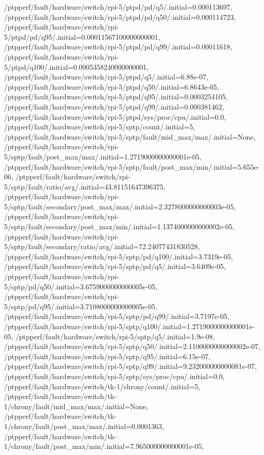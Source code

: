 {    /ptpperf/fault/hardware/switch/rpi-5/ptpd/pd/q5/.initial=0.000113697,
    /ptpperf/fault/hardware/switch/rpi-5/ptpd/pd/q50/.initial=0.000114723,
    /ptpperf/fault/hardware/switch/rpi-5/ptpd/pd/q95/.initial=0.00011567100000000001,
    /ptpperf/fault/hardware/switch/rpi-5/ptpd/pd/q99/.initial=0.00011618,
    /ptpperf/fault/hardware/switch/rpi-5/ptpd/q100/.initial=0.0005358240000000001,
    /ptpperf/fault/hardware/switch/rpi-5/ptpd/q5/.initial=6.88e-07,
    /ptpperf/fault/hardware/switch/rpi-5/ptpd/q50/.initial=6.8643e-05,
    /ptpperf/fault/hardware/switch/rpi-5/ptpd/q95/.initial=0.0003254105,
    /ptpperf/fault/hardware/switch/rpi-5/ptpd/q99/.initial=0.000381462,
    /ptpperf/fault/hardware/switch/rpi-5/ptpd/sys/proc/cpu/.initial=0.0,
    /ptpperf/fault/hardware/switch/rpi-5/sptp/count/.initial=5,
    /ptpperf/fault/hardware/switch/rpi-5/sptp/fault/mid_max/max/.initial=None,
    /ptpperf/fault/hardware/switch/rpi-5/sptp/fault/post_max/max/.initial=1.2719000000000001e-05,
    /ptpperf/fault/hardware/switch/rpi-5/sptp/fault/post_max/min/.initial=5.655e-06,
    /ptpperf/fault/hardware/switch/rpi-5/sptp/fault/ratio/avg/.initial=43.81151647396375,
    /ptpperf/fault/hardware/switch/rpi-5/sptp/fault/secondary/post_max/max/.initial=2.3278000000000003e-05,
    /ptpperf/fault/hardware/switch/rpi-5/sptp/fault/secondary/post_max/min/.initial=1.1374000000000002e-05,
    /ptpperf/fault/hardware/switch/rpi-5/sptp/fault/secondary/ratio/avg/.initial=72.24077431830528,
    /ptpperf/fault/hardware/switch/rpi-5/sptp/pd/q100/.initial=3.7319e-05,
    /ptpperf/fault/hardware/switch/rpi-5/sptp/pd/q5/.initial=3.6409e-05,
    /ptpperf/fault/hardware/switch/rpi-5/sptp/pd/q50/.initial=3.6759000000000005e-05,
    /ptpperf/fault/hardware/switch/rpi-5/sptp/pd/q95/.initial=3.7108000000000005e-05,
    /ptpperf/fault/hardware/switch/rpi-5/sptp/pd/q99/.initial=3.7197e-05,
    /ptpperf/fault/hardware/switch/rpi-5/sptp/q100/.initial=1.2719000000000001e-05,
    /ptpperf/fault/hardware/switch/rpi-5/sptp/q5/.initial=1.9e-08,
    /ptpperf/fault/hardware/switch/rpi-5/sptp/q50/.initial=2.1100000000000002e-07,
    /ptpperf/fault/hardware/switch/rpi-5/sptp/q95/.initial=6.15e-07,
    /ptpperf/fault/hardware/switch/rpi-5/sptp/q99/.initial=9.232000000000081e-07,
    /ptpperf/fault/hardware/switch/rpi-5/sptp/sys/proc/cpu/.initial=0.0,
    /ptpperf/fault/hardware/switch/tk-1/chrony/count/.initial=5,
    /ptpperf/fault/hardware/switch/tk-1/chrony/fault/mid_max/max/.initial=None,
    /ptpperf/fault/hardware/switch/tk-1/chrony/fault/post_max/max/.initial=0.0001363,
    /ptpperf/fault/hardware/switch/tk-1/chrony/fault/post_max/min/.initial=7.965000000000001e-05,
}
